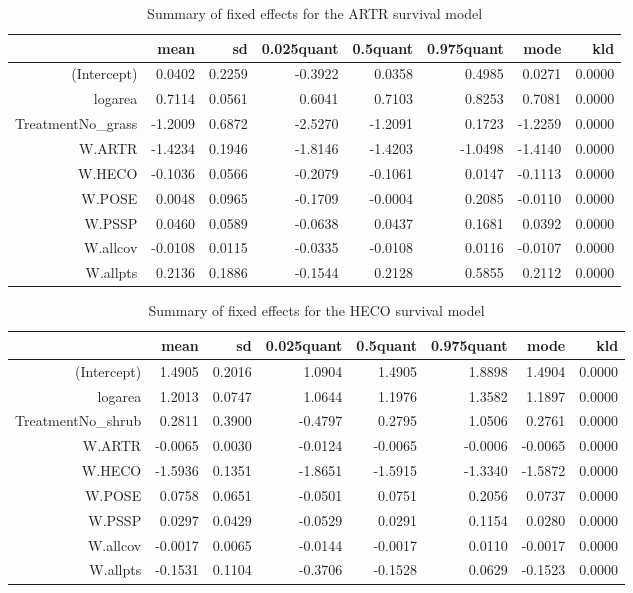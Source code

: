 \begin{table}[ht]
\centering
\caption{Summary of fixed effects for the ARTR survival model} 
\label{ARTRsurvival}
\begin{tabular}{rrrrrrrr}
  \hline
 & mean & sd & 0.025quant & 0.5quant & 0.975quant & mode & kld \\ 
  \hline
(Intercept) & 0.0402 & 0.2259 & -0.3922 & 0.0358 & 0.4985 & 0.0271 & 0.0000 \\ 
  logarea & 0.7114 & 0.0561 & 0.6041 & 0.7103 & 0.8253 & 0.7081 & 0.0000 \\ 
  TreatmentNo\_grass & -1.2009 & 0.6872 & -2.5270 & -1.2091 & 0.1723 & -1.2259 & 0.0000 \\ 
  W.ARTR & -1.4234 & 0.1946 & -1.8146 & -1.4203 & -1.0498 & -1.4140 & 0.0000 \\ 
  W.HECO & -0.1036 & 0.0566 & -0.2079 & -0.1061 & 0.0147 & -0.1113 & 0.0000 \\ 
  W.POSE & 0.0048 & 0.0965 & -0.1709 & -0.0004 & 0.2085 & -0.0110 & 0.0000 \\ 
  W.PSSP & 0.0460 & 0.0589 & -0.0638 & 0.0437 & 0.1681 & 0.0392 & 0.0000 \\ 
  W.allcov & -0.0108 & 0.0115 & -0.0335 & -0.0108 & 0.0116 & -0.0107 & 0.0000 \\ 
  W.allpts & 0.2136 & 0.1886 & -0.1544 & 0.2128 & 0.5855 & 0.2112 & 0.0000 \\ 
   \hline
\end{tabular}
\end{table}

\begin{table}[ht]
\centering
\caption{Summary of fixed effects for the HECO survival model} 
\label{HECOsurvival}
\begin{tabular}{rrrrrrrr}
  \hline
 & mean & sd & 0.025quant & 0.5quant & 0.975quant & mode & kld \\ 
  \hline
(Intercept) & 1.4905 & 0.2016 & 1.0904 & 1.4905 & 1.8898 & 1.4904 & 0.0000 \\ 
  logarea & 1.2013 & 0.0747 & 1.0644 & 1.1976 & 1.3582 & 1.1897 & 0.0000 \\ 
  TreatmentNo\_shrub & 0.2811 & 0.3900 & -0.4797 & 0.2795 & 1.0506 & 0.2761 & 0.0000 \\ 
  W.ARTR & -0.0065 & 0.0030 & -0.0124 & -0.0065 & -0.0006 & -0.0065 & 0.0000 \\ 
  W.HECO & -1.5936 & 0.1351 & -1.8651 & -1.5915 & -1.3340 & -1.5872 & 0.0000 \\ 
  W.POSE & 0.0758 & 0.0651 & -0.0501 & 0.0751 & 0.2056 & 0.0737 & 0.0000 \\ 
  W.PSSP & 0.0297 & 0.0429 & -0.0529 & 0.0291 & 0.1154 & 0.0280 & 0.0000 \\ 
  W.allcov & -0.0017 & 0.0065 & -0.0144 & -0.0017 & 0.0110 & -0.0017 & 0.0000 \\ 
  W.allpts & -0.1531 & 0.1104 & -0.3706 & -0.1528 & 0.0629 & -0.1523 & 0.0000 \\ 
   \hline
\end{tabular}
\end{table}

